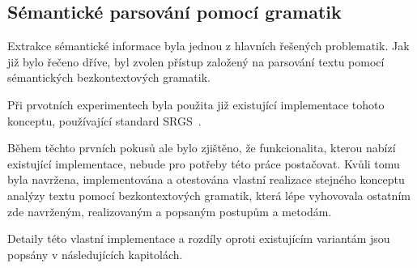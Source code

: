 \subsection{Sémantické parsování pomocí gramatik}\label{subsec:moje_gramatiky}
Extrakce sémantické informace byla jednou z hlavních řešených problematik.
Jak již bylo řečeno dříve, byl zvolen přístup založený na parsování textu pomocí sémantických bezkontextových gramatik.

Při prvotních experimentech byla použita již existující implementace tohoto konceptu,
používající standard SRGS~\cite{srgs}.

Během těchto prvních pokusů ale bylo zjištěno, že funkcionalita, kterou nabízí existující implementace,
nebude pro potřeby této práce postačovat.
Kvůli tomu byla navržena, implementována a otestována vlastní realizace stejného konceptu
analýzy textu pomocí bezkontextových gramatik, která lépe vyhovovala ostatním zde navrženým,
realizovaným a popsaným postupům a metodám.

Detaily této vlastní implementace a rozdíly oproti existujícím variantám jsou popsány v následujících kapitolách.

